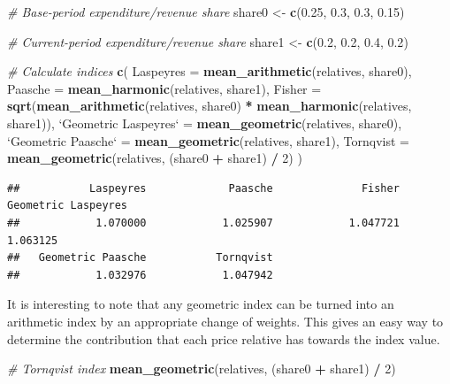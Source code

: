 \documentclass[]{article}
\newenvironment{Shaded}{\begin{snugshade}}{\end{snugshade}}
\newcommand{\CommentTok}[1]{\textcolor[rgb]{0.56,0.35,0.01}{\textit{#1}}}
\newcommand{\DataTypeTok}[1]{\textcolor[rgb]{0.13,0.29,0.53}{#1}}
\newcommand{\DecValTok}[1]{\textcolor[rgb]{0.00,0.00,0.81}{#1}}
\newcommand{\FloatTok}[1]{\textcolor[rgb]{0.00,0.00,0.81}{#1}}
\newcommand{\KeywordTok}[1]{\textcolor[rgb]{0.13,0.29,0.53}{\textbf{#1}}}
\newcommand{\NormalTok}[1]{#1}
\newcommand{\OperatorTok}[1]{\textcolor[rgb]{0.81,0.36,0.00}{\textbf{#1}}}
\newcommand{\StringTok}[1]{\textcolor[rgb]{0.31,0.60,0.02}{#1}}
\begin{document}
\begin{Shaded}
\begin{Highlighting}[]
\CommentTok{# Base-period expenditure/revenue share}
\NormalTok{share0 <-}\StringTok{ }\KeywordTok{c}\NormalTok{(}\FloatTok{0.25}\NormalTok{, }\FloatTok{0.3}\NormalTok{, }\FloatTok{0.3}\NormalTok{, }\FloatTok{0.15}\NormalTok{) }

\CommentTok{# Current-period expenditure/revenue share}
\NormalTok{share1 <-}\StringTok{ }\KeywordTok{c}\NormalTok{(}\FloatTok{0.2}\NormalTok{, }\FloatTok{0.2}\NormalTok{, }\FloatTok{0.4}\NormalTok{, }\FloatTok{0.2}\NormalTok{)}

\CommentTok{# Calculate indices}
\KeywordTok{c}\NormalTok{(}
  \DataTypeTok{Laspeyres =} \KeywordTok{mean_arithmetic}\NormalTok{(relatives, share0),}
  \DataTypeTok{Paasche =} \KeywordTok{mean_harmonic}\NormalTok{(relatives, share1),}
  \DataTypeTok{Fisher =} \KeywordTok{sqrt}\NormalTok{(}\KeywordTok{mean_arithmetic}\NormalTok{(relatives, share0) }\OperatorTok{*}\StringTok{ }\KeywordTok{mean_harmonic}\NormalTok{(relatives, share1)),}
  \StringTok{`}\DataTypeTok{Geometric Laspeyres}\StringTok{`}\NormalTok{ =}\StringTok{ }\KeywordTok{mean_geometric}\NormalTok{(relatives, share0),}
  \StringTok{`}\DataTypeTok{Geometric Paasche}\StringTok{`}\NormalTok{ =}\StringTok{ }\KeywordTok{mean_geometric}\NormalTok{(relatives, share1),}
  \DataTypeTok{Tornqvist =} \KeywordTok{mean_geometric}\NormalTok{(relatives, (share0 }\OperatorTok{+}\StringTok{ }\NormalTok{share1) }\OperatorTok{/}\StringTok{ }\DecValTok{2}\NormalTok{)}
\NormalTok{)}
\end{Highlighting}
\end{Shaded}

\begin{verbatim}
##           Laspeyres             Paasche              Fisher Geometric Laspeyres 
##            1.070000            1.025907            1.047721            1.063125 
##   Geometric Paasche           Tornqvist 
##            1.032976            1.047942
\end{verbatim}

It is interesting to note that any geometric index can be turned into an arithmetic index by an appropriate change of weights. This gives an easy way to determine the contribution that each price relative has towards the index value.

\begin{Shaded}
\begin{Highlighting}[]
\CommentTok{# Tornqvist index}
\KeywordTok{mean_geometric}\NormalTok{(relatives, (share0 }\OperatorTok{+}\StringTok{ }\NormalTok{share1) }\OperatorTok{/}\StringTok{ }\DecValTok{2}\NormalTok{) }
\end{Highlighting}
\end{Shaded}
\end{document}
